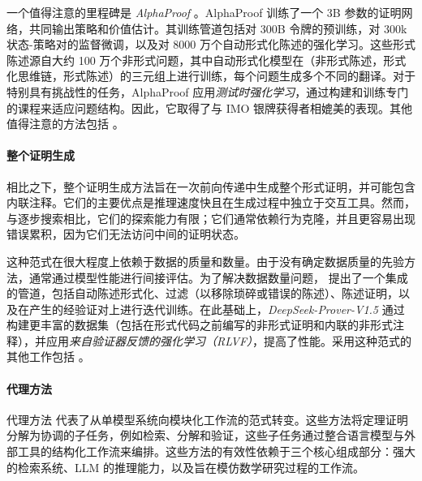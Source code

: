 \documentclass[11pt]{article}
\numberwithin{equation}{section}
\begin{document}
一个值得注意的里程碑是 \textit{AlphaProof} \cite{hubert2025olympiad}。AlphaProof 训练了一个 3B 参数的证明网络，共同输出策略和价值估计。其训练管道包括对 300B 令牌的预训练，对 300k 状态-策略对的监督微调，以及对 8000 万个自动形式化陈述的强化学习。这些形式陈述源自大约 100 万个非形式问题，其中自动形式化模型在（非形式陈述，形式化思维链，形式陈述）的三元组上进行训练，每个问题生成多个不同的翻译。对于特别具有挑战性的任务，AlphaProof 应用\textit{测试时强化学习}，通过构建和训练专门的课程来适应问题结构。因此，它取得了与 IMO 银牌获得者相媲美的表现。其他值得注意的方法包括 \cite{jiang2022thor, polu2023formal, wang-etal-2023-dt, yang2023leandojo, xin2025bfs, li2024hunyuanprover,xin2025scaling}。

\paragraph{整个证明生成}
相比之下，整个证明生成方法旨在一次前向传递中生成整个形式证明，并可能包含内联注释。它们的主要优点是推理速度快且在生成过程中独立于交互工具。然而，与逐步搜索相比，它们的探索能力有限；它们通常依赖行为克隆，并且更容易出现错误累积，因为它们无法访问中间的证明状态。

这种范式在很大程度上依赖于数据的质量和数量。由于没有确定数据质量的先验方法，通常通过模型性能进行间接评估。为了解决数据数量问题，\cite{xin2024deepseek} 提出了一个集成的管道，包括自动陈述形式化、过滤（以移除琐碎或错误的陈述）、陈述证明，以及在产生的经验证对上进行迭代训练。在此基础上，\textit{DeepSeek-Prover-V1.5} \cite{xin2025deepseekproverv} 通过构建更丰富的数据集（包括在形式代码之前编写的非形式证明和内联的非形式注释），并应用\textit{来自验证器反馈的强化学习（RLVF）}，提高了性能。采用这种范式的其他工作包括 \cite{first2023baldur, azerbayev2024llemma, ying2024internlm, dong2025stp, zhang2025leanabell,wang2025kimina,lin2025goedel}。

\paragraph{代理方法}
代理方法 \cite{jiang2023draft,wang2024legoprover,varambally2025hilbert,Chen_et_al_2025_Seed-Prover1.5,jiang2025fate,gloeckle2025reinforcement,achim2025aristotle} 代表了从单模型系统向模块化工作流的范式转变。这些方法将定理证明分解为协调的子任务，例如检索、分解和验证，这些子任务通过整合语言模型与外部工具的结构化工作流来编排。这些方法的有效性依赖于三个核心组成部分：强大的检索系统、LLM 的推理能力，以及旨在模仿数学研究过程的工作流。
\end{document}
